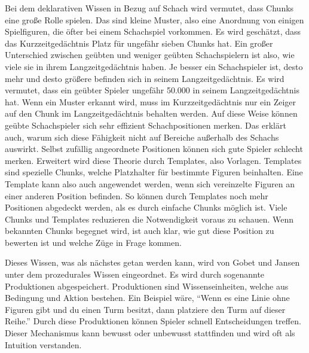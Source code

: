 Bei dem deklarativen Wissen in Bezug auf Schach wird vermutet, dass Chunks eine große Rolle spielen. Das sind kleine Muster, also eine Anordnung von einigen Spielfiguren, die öfter bei einem Schachspiel vorkommen. Es wird geschätzt, dass das Kurzzeitgedächtnis Platz für ungefähr sieben Chunks hat. Ein großer Unterschied zwischen geübten und weniger geübten Schachspielern ist also, wie viele sie in ihrem Langzeitgedächtnis haben. Je besser ein Schachspieler ist, desto mehr und desto größere befinden sich in seinem Langzeitgedächtnis. Es wird vermutet, dass ein geübter Spieler ungefähr 50.000 in seinem Langzeitgedächtnis hat. Wenn ein Muster erkannt wird, muss im Kurzzeitgedächtnis nur ein Zeiger auf den Chunk im Langzeitgedächtnis behalten werden. Auf diese Weise können geübte Schachspieler sich sehr effizient Schachpositionen merken. Das erklärt auch, warum sich diese Fähigkeit nicht auf Bereiche außerhalb des Schachs auswirkt. Selbst zufällig angeordnete Positionen können sich gute Spieler schlecht merken. Erweitert wird diese Theorie durch Templates, also Vorlagen. Templates sind spezielle Chunks, welche Platzhalter für bestimmte Figuren beinhalten. Eine Template kann also auch angewendet werden, wenn sich vereinzelte Figuren an einer anderen Position befinden. So können durch Templates noch mehr Positionen abgedeckt werden, als es durch einfache Chunks möglich ist. Viele Chunks und Templates reduzieren die Notwendigkeit voraus zu schauen. Wenn bekannten Chunks begegnet wird, ist auch klar, wie gut diese Position zu bewerten ist und welche Züge in Frage kommen.
\cite{gobet_templates_1996}


Dieses Wissen, was als nächstes getan werden kann, wird von Gobet und Jansen unter dem prozedurales Wissen eingeordnet. Es wird durch sogenannte Produktionen abgespeichert. Produktionen sind Wissenseinheiten, welche aus Bedingung und Aktion bestehen. Ein Beispiel wäre, \enquote{Wenn es eine Linie ohne Figuren gibt und du einen Turm besitzt, dann platziere den Turm auf dieser Reihe.} Durch diese Produktionen können Spieler schnell Entscheidungen treffen. Dieser Mechanismus kann bewusst oder unbewusst stattfinden und wird oft als Intuition verstanden.
\cite{gobet_training_2006}

